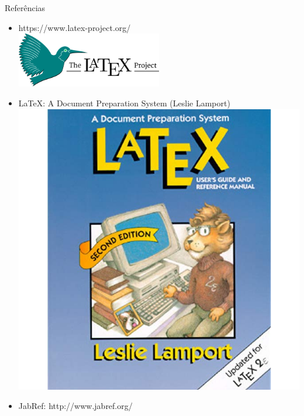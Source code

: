 \documentclass{beamer}
\begin{document}
\begin{frame}{Referências}
	
	
			\begin{itemize}
				\item https://www.latex-project.org/ \\
				\includegraphics[width=0.5\textwidth]{latex-project-logo.png}
				
				
				\item LaTeX: A Document Preparation System (Leslie Lamport) \\
				\includegraphics[scale=0.2]{livro.png}
				
				\item JabRef: http://www.jabref.org/
			\end{itemize}

	
	
\end{frame}
\end{document}
